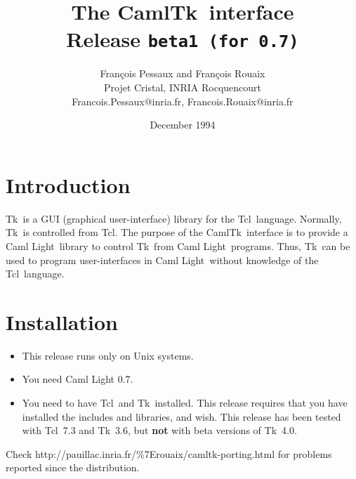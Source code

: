 
\newcommand{\tcl}	{{\sf Tcl}}
\newcommand{\tk}	{{\sf Tk}}
\newcommand{\caml}	{{\sf Caml Light}}
\newcommand{\camltk}	{{\sf CamlTk}}
\newcommand{\wish}	{{\sf wish}}
\newcommand{\thisrelease}{{\tt beta1 (for 0.7)}}


\title{The \camltk\ interface \\
       Release \thisrelease}

\author{Fran\c{c}ois Pessaux and Fran\c{c}ois Rouaix \\
           Projet Cristal, INRIA Rocquencourt \\
        {\small Francois.Pessaux@inria.fr, Francois.Rouaix@inria.fr}
        }
\date{December 1994}


\maketitle
\tableofcontents
\newpage

\section*{Introduction}

\tk\ is a GUI (graphical user-interface) library for the \tcl\ language.
Normally, \tk\ is controlled from \tcl. The purpose of the \camltk\
interface is to provide a \caml\ library to control \tk\ from \caml\
programs. Thus, \tk\ can be used to program user-interfaces in \caml\
without knowledge of the \tcl\ language.

\section*{Installation}

\begin{itemize}
\item This release runs only on Unix systems.
\item You need Caml Light 0.7.
\item You need to have \tcl\ and \tk\ installed. This release requires that
you have installed the includes and libraries, and \wish.
This release has been tested with \tcl\ 7.3 and \tk\ 3.6, but {\bf not} with
beta versions of \tk\ 4.0.
\end{itemize} 

\begin{htmlonly}
Check 
                  {http://pauillac.inria.fr/\%7Erouaix/camltk-porting.html}
for problems reported since the distribution.
\end{htmlonly}

